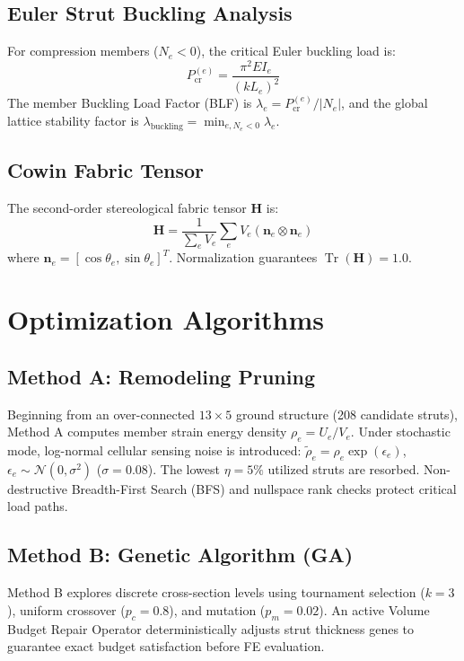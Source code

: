 \documentclass[10pt,journal,compsoc]{IEEEtran}
\begin{document}
\subsection{Euler Strut Buckling Analysis}
For compression members ($N_e < 0$), the critical Euler buckling load is:
\begin{equation}
P_{\text{cr}}^{(e)} = \frac{\pi^2 E I_e}{(k L_e)^2}
\end{equation}
The member Buckling Load Factor (BLF) is $\lambda_e = P_{\text{cr}}^{(e)} / |N_e|$, and the global lattice stability factor is $\lambda_{\text{buckling}} = \min_{e, N_e < 0} \lambda_e$.

\subsection{Cowin Fabric Tensor}
The second-order stereological fabric tensor $\mathbf{H}$ \cite{cowin1985relationship, harrigan1984characterization} is:
\begin{equation}
\mathbf{H} = \frac{1}{\sum_e V_e} \sum_e V_e (\mathbf{n}_e \otimes \mathbf{n}_e)
\end{equation}
where $\mathbf{n}_e = [\cos\theta_e, \sin\theta_e]^T$. Normalization guarantees $\operatorname{Tr}(\mathbf{H}) = 1.0$.

\section{Optimization Algorithms}

\subsection{Method A: Remodeling Pruning}
Beginning from an over-connected $13 \times 5$ ground structure (208 candidate struts), Method A computes member strain energy density $\rho_e = U_e / V_e$. Under stochastic mode, log-normal cellular sensing noise is introduced: $\widetilde{\rho}_e = \rho_e \exp(\epsilon_e)$, $\epsilon_e \sim \mathcal{N}(0, \sigma^2)$ ($\sigma = 0.08$). The lowest $\eta = 5\%$ utilized struts are resorbed. Non-destructive Breadth-First Search (BFS) and nullspace rank checks protect critical load paths.

\subsection{Method B: Genetic Algorithm (GA)}
Method B explores discrete cross-section levels using tournament selection ($k=3$), uniform crossover ($p_c = 0.8$), and mutation ($p_m = 0.02$). An active Volume Budget Repair Operator deterministically adjusts strut thickness genes to guarantee exact budget satisfaction before FE evaluation.
\end{document}
